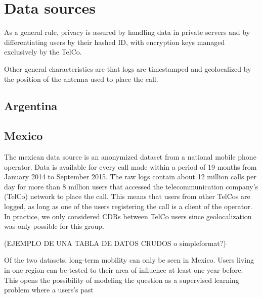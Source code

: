 \section{Data sources}

As a general rule, privacy is assured by handling data in private servers and by differentiating users by their hashed ID, with encryption keys managed exclusively by the TelCo.

Other general characteristics are that logs are timestamped and geolocalized by the position of the antenna used to place the call.

\subsection{Argentina}

\subsection{Mexico}

The mexican data source is an anonymized dataset from a national mobile phone operator. Data is available for every call made within a period of 19 months from January 2014 to September 2015. The raw logs contain about 12 million calls per day for more than 8 million users that accessed the telecommunication company's (TelCo) network to place the call. This means that users from other TelCos are logged, as long as one of the users registering the call is a client of the operator. In practice, we only considered CDRs between TelCo users since geolocalization was only possible for this group.

(EJEMPLO DE UNA TABLA DE DATOS CRUDOS o simpleformat?)

Of the two datasets, long-term mobility can only be seen in Mexico. Users living in one region can be tested to their area of influence at least one year before. This opens the possibility of modeling the question as a supervised learning problem where a users's past 




